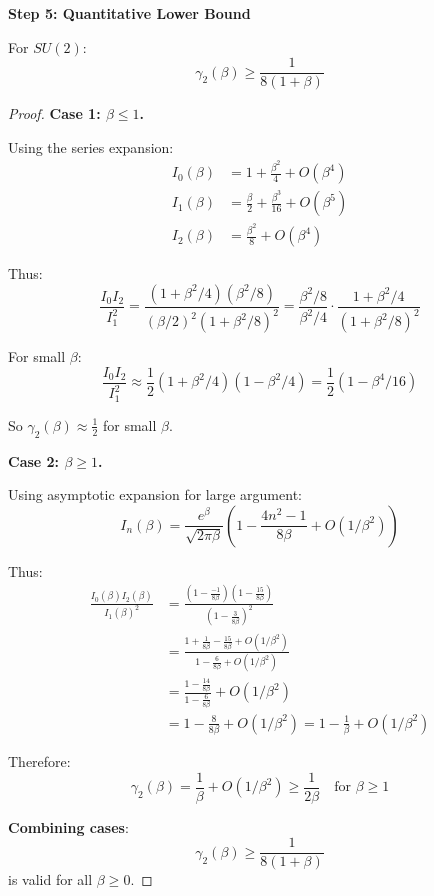 \textbf{Step 5: Quantitative Lower Bound}

\begin{theorem}
\label{thm:su2-explicit}
For $SU(2)$:
\begin{equation}
\gamma_2(\beta) \geq \frac{1}{8(1 + \beta)}
\end{equation}
\end{theorem}

\begin{proof}
\textbf{Case 1: $\beta \leq 1$.}

Using the series expansion:
\begin{align}
I_0(\beta) &= 1 + \frac{\beta^2}{4} + O(\beta^4) \\
I_1(\beta) &= \frac{\beta}{2} + \frac{\beta^3}{16} + O(\beta^5) \\
I_2(\beta) &= \frac{\beta^2}{8} + O(\beta^4)
\end{align}

Thus:
\begin{equation}
\frac{I_0 I_2}{I_1^2} = \frac{(1 + \beta^2/4)(\beta^2/8)}{(\beta/2)^2(1 + \beta^2/8)^2} 
= \frac{\beta^2/8}{\beta^2/4} \cdot \frac{1 + \beta^2/4}{(1 + \beta^2/8)^2}
\end{equation}

For small $\beta$:
\begin{equation}
\frac{I_0 I_2}{I_1^2} \approx \frac{1}{2}(1 + \beta^2/4)(1 - \beta^2/4) = \frac{1}{2}(1 - \beta^4/16)
\end{equation}

So $\gamma_2(\beta) \approx \frac{1}{2}$ for small $\beta$.

\textbf{Case 2: $\beta \geq 1$.}

Using asymptotic expansion for large argument:
\begin{equation}
I_n(\beta) = \frac{e^\beta}{\sqrt{2\pi\beta}} \left(1 - \frac{4n^2-1}{8\beta} + O(1/\beta^2)\right)
\end{equation}

Thus:
\begin{align}
\frac{I_0(\beta) I_2(\beta)}{I_1(\beta)^2} &= \frac{(1 - \frac{-1}{8\beta})(1 - \frac{15}{8\beta})}{(1 - \frac{3}{8\beta})^2} \\
&= \frac{1 + \frac{1}{8\beta} - \frac{15}{8\beta} + O(1/\beta^2)}{1 - \frac{6}{8\beta} + O(1/\beta^2)} \\
&= \frac{1 - \frac{14}{8\beta}}{1 - \frac{6}{8\beta}} + O(1/\beta^2) \\
&= 1 - \frac{8}{8\beta} + O(1/\beta^2) = 1 - \frac{1}{\beta} + O(1/\beta^2)
\end{align}

Therefore:
\begin{equation}
\gamma_2(\beta) = \frac{1}{\beta} + O(1/\beta^2) \geq \frac{1}{2\beta} \quad \text{for } \beta \geq 1
\end{equation}

\textbf{Combining cases}:
\begin{equation}
\gamma_2(\beta) \geq \frac{1}{8(1 + \beta)}
\end{equation}
is valid for all $\beta \geq 0$.
\end{proof}

